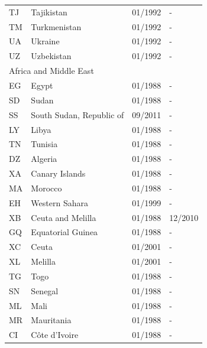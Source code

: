 \begin{small}
\begin{longtable}{p{0.5cm}p{9cm}p{2cm}p{2cm}}
TJ	&	Tajikistan	&	01/1992	&	-	\\

TM	&	Turkmenistan	&	01/1992	&	-	\\

UA	&	Ukraine	&	01/1992	&	-	\\

UZ	&	Uzbekistan	&	01/1992	&	-	\\

\midrule
\multicolumn{3}{l}{Africa and Middle East}	&	\\
EG	&	Egypt	&	01/1988	&	-	\\

SD	&	Sudan	&	01/1988	&	-	\\

SS	&	South Sudan, Republic of	&	09/2011	&	-	\\

LY	&	Libya	&	01/1988	&	-	\\

TN	&	Tunisia	&	01/1988	&	-	\\

DZ	&	Algeria	&	01/1988	&	-	\\

XA	&	Canary Islands	&	01/1988	&	-	\\

MA	&	Morocco	&	01/1988	&	-	\\

EH	&	Western Sahara	&	01/1999	&	-	\\

XB	&	Ceuta and Melilla	&	01/1988	&	12/2010	\\

GQ	&	Equatorial Guinea	&	01/1988	&	-	\\

XC	&	Ceuta	&	01/2001	&	-	\\

XL	&	Melilla	&	01/2001	&	-	\\

TG	&	Togo	&	01/1988	&	-	\\

SN	&	Senegal	&	01/1988	&	-	\\

ML	&	Mali	&	01/1988	&	-	\\

MR	&	Mauritania	&	01/1988	&	-	\\

CI	&	Côte d'Ivoire	&	01/1988	&	-	\\


\end{longtable}
\end{small}
